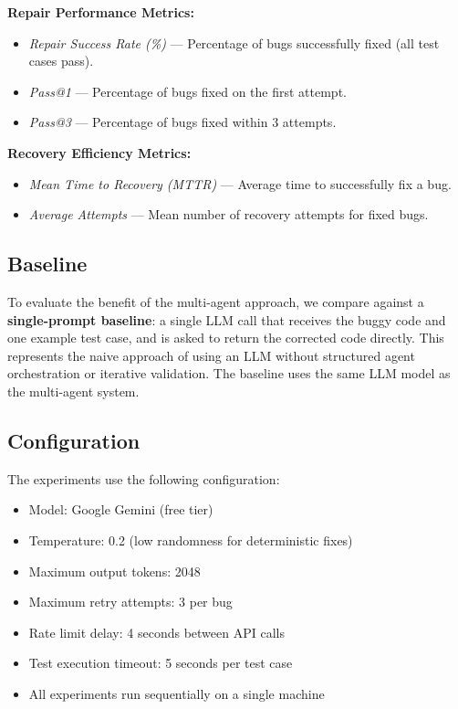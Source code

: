 \documentclass[conference]{IEEEtran}
\begin{document}
\textbf{Repair Performance Metrics:}
\begin{itemize}
    \item \textit{Repair Success Rate (\%)} --- Percentage of bugs successfully fixed (all test cases pass).
    \item \textit{Pass@1} --- Percentage of bugs fixed on the first attempt.
    \item \textit{Pass@3} --- Percentage of bugs fixed within 3 attempts.
\end{itemize}

\textbf{Recovery Efficiency Metrics:}
\begin{itemize}
    \item \textit{Mean Time to Recovery (MTTR)} --- Average time to successfully fix a bug.
    \item \textit{Average Attempts} --- Mean number of recovery attempts for fixed bugs.
\end{itemize}

\subsection{Baseline}
To evaluate the benefit of the multi-agent approach, we compare against a \textbf{single-prompt baseline}: a single LLM call that receives the buggy code and one example test case, and is asked to return the corrected code directly. This represents the naive approach of using an LLM without structured agent orchestration or iterative validation. The baseline uses the same LLM model as the multi-agent system.

\subsection{Configuration}
The experiments use the following configuration:
\begin{itemize}
    \item Model: Google Gemini (free tier)
    \item Temperature: 0.2 (low randomness for deterministic fixes)
    \item Maximum output tokens: 2048
    \item Maximum retry attempts: 3 per bug
    \item Rate limit delay: 4 seconds between API calls
    \item Test execution timeout: 5 seconds per test case
    \item All experiments run sequentially on a single machine
\end{itemize}
\end{document}
